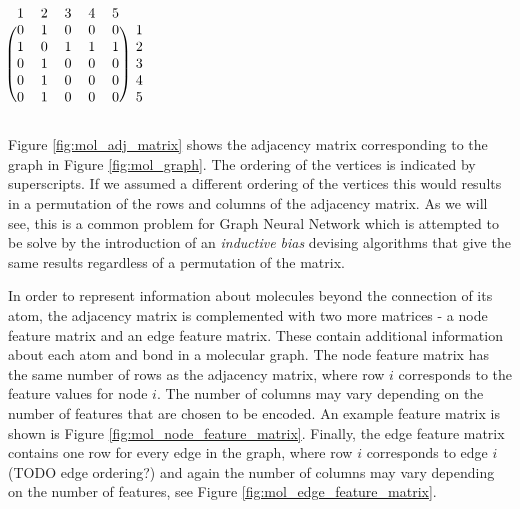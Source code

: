 \begin{minipage}{0.5\textwidth}
	\centering
	\label{fig:mol_graph}
\end{minipage}
\begin{minipage}{0.5\textwidth}
	\centering
	$
	\begin{blockarray}{cccccc}
	1 & 2 & 3 & 4 & 5 \\
	\begin{block}{(ccccc)c}
	0 & 1 & 0 & 0 & 0 & 1 \\
	1 & 0 & 1 & 1 & 1 & 2 \\
	0 & 1 & 0 & 0 & 0 & 3 \\
	0 & 1 & 0 & 0 & 0 & 4 \\
	0 & 1 & 0 & 0 & 0 & 5 \\
	\end{block}
	\end{blockarray}
	$
	\label{fig:mol_adj_matrix}
\end{minipage}
\newline\newline
Figure \ref{fig:mol_adj_matrix} shows the adjacency matrix corresponding to the graph in Figure \ref{fig:mol_graph}. The ordering of the vertices is indicated by superscripts. If we assumed a different ordering of the vertices this would results in a permutation of the rows and columns of the adjacency matrix. As we will see, this is a common problem for Graph Neural Network which is attempted to be solve by the introduction of an \emph{inductive bias} devising algorithms that give the same results regardless of a permutation of the matrix.

In order to represent information about molecules beyond the connection of its atom, the adjacency matrix is complemented with two more matrices - a node feature matrix and an edge feature matrix. These contain additional information about each atom and bond in a molecular graph. The node feature matrix has the same number of rows as the adjacency matrix, where row $i$ corresponds to the feature values for node $i$. The number of columns may vary depending on the number of features that are chosen to be encoded. An example feature matrix is shown is Figure \ref{fig:mol_node_feature_matrix}. Finally, the edge feature matrix contains one row for every edge in the graph, where row $i$ corresponds to edge $i$ (TODO edge ordering?) and again the number of columns may vary depending on the number of features, see Figure \ref{fig:mol_edge_feature_matrix}.

